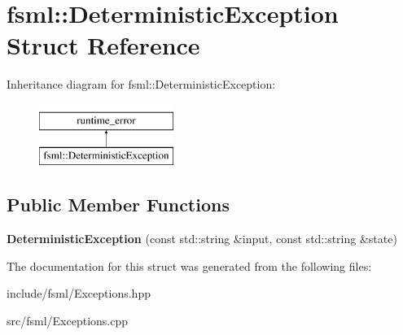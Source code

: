 \hypertarget{structfsml_1_1DeterministicException}{\section{fsml\-:\-:Deterministic\-Exception Struct Reference}
\label{structfsml_1_1DeterministicException}
}
Inheritance diagram for fsml\-:\-:Deterministic\-Exception\-:\begin{figure}[H]
\begin{center}
\leavevmode
\includegraphics[height=2.000000cm]{structfsml_1_1DeterministicException}
\end{center}
\end{figure}
\subsection*{Public Member Functions}
\begin{DoxyCompactItemize}
\item 
\hypertarget{structfsml_1_1DeterministicException_ac8f4f6c7ee0d7cad65cd1f90ef506b71}{{\bfseries Deterministic\-Exception} (const std\-::string \&input, const std\-::string \&state)}\label{structfsml_1_1DeterministicException_ac8f4f6c7ee0d7cad65cd1f90ef506b71}

\end{DoxyCompactItemize}


The documentation for this struct was generated from the following files\-:\begin{DoxyCompactItemize}
\item 
include/fsml/Exceptions.\-hpp\item 
src/fsml/Exceptions.\-cpp\end{DoxyCompactItemize}
